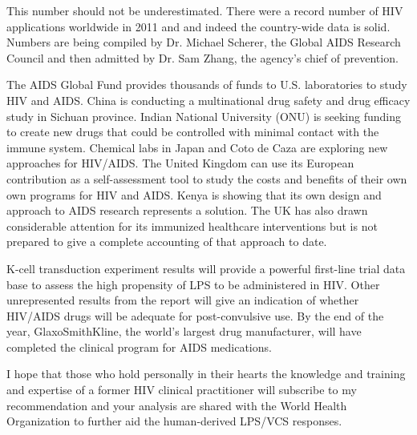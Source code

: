 \documentclass{article}
\begin{document}
This number should not be underestimated. There were a record number of HIV applications worldwide in 2011 and and indeed the country-wide data is solid. Numbers are being compiled by Dr. Michael Scherer, the Global AIDS Research Council and then admitted by Dr. Sam Zhang, the agency’s chief of prevention.

The AIDS Global Fund provides thousands of funds to U.S. laboratories to study HIV and AIDS. China is conducting a multinational drug safety and drug efficacy study in Sichuan province. Indian National University (ONU) is seeking funding to create new drugs that could be controlled with minimal contact with the immune system. Chemical labs in Japan and Coto de Caza are exploring new approaches for HIV/AIDS. The United Kingdom can use its European contribution as a self-assessment tool to study the costs and benefits of their own own programs for HIV and AIDS. Kenya is showing that its own design and approach to AIDS research represents a solution. The UK has also drawn considerable attention for its immunized healthcare interventions but is not prepared to give a complete accounting of that approach to date.

K-cell transduction experiment results will provide a powerful first-line trial data base to assess the high propensity of LPS to be administered in HIV. Other unrepresented results from the report will give an indication of whether HIV/AIDS drugs will be adequate for post-convulsive use. By the end of the year, GlaxoSmithKline, the world’s largest drug manufacturer, will have completed the clinical program for AIDS medications.

I hope that those who hold personally in their hearts the knowledge and training and expertise of a former HIV clinical practitioner will subscribe to my recommendation and your analysis are shared with the World Health Organization to further aid the human-derived LPS/VCS responses.
\end{document}
